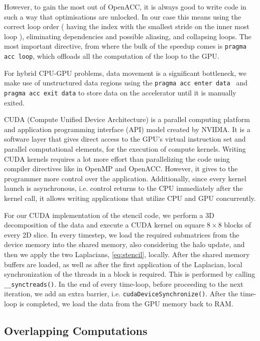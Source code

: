 However, to gain the most out of OpenACC, it is always good to write code in such a way that optimisations are unlocked. In our case this means using the correct loop order ( having the index with the smallest stride on the inner most loop ), eliminating dependencies and possible aliasing, and collapsing loops. The most important directive, from where the bulk of the speedup comes is \texttt{pragma acc loop}, which offloads  all the computation of the loop to the GPU.

For hybrid CPU-GPU problems, data movement is a significant bottleneck, we make use of unstructured data regions using the \texttt{pragma acc enter data } and \texttt{pragma acc exit data} to store data on the accelerator until it is manually exited. 

CUDA (Compute Unified Device Architecture) is a parallel computing platform and application programming interface (API) model created by NVIDIA.
It is a software layer that gives direct access to the GPU's virtual instruction set and parallel computational elements, for the execution of compute kernels.
Writing CUDA kernels requires a lot more effort than parallelizing the code using compiler directives like in OpenMP and OpenACC.
However, it gives to the programmer more control over the application.
Additionally, since every kernel launch is asynchronous, i.e. control returns to the CPU immediately after the kernel call, it allows writing applications that utilize CPU and GPU concurrently.

For our CUDA implementation of the stencil code, we perform a 3D decomposition of the data and execute a CUDA kernel on square $8 \times 8$ blocks of every 2D slice.
In every timestep, we load the required submatrices from the device memory into the shared memory, also considering the halo update, and then we apply the two Laplacians, \cref{eq:stencil}, locally.
After the shared memory buffers are loaded, as well as after the first application of the Laplacian, local synchronization of the threads in a block is required.
This is performed by calling \texttt{\_\_synctreads()}. 
In the end of every time-loop, before proceeding to the next iteration, we add an extra barrier, i.e. \texttt{cudaDeviceSynchronize()}.
After the time-loop is completed, we load the data from the GPU memory back to RAM.


\subsection{Overlapping Computations}


